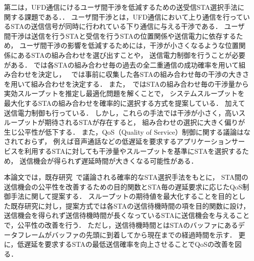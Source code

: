 \documentclass[master]{kuisthesis}		%
\begin{document}
\par
第二は，UFD通信にけるユーザ間干渉を低減するための送受信STA選択手法に関する課題である．．
ユーザ間干渉とは，UFD通信において上り通信を行っているSTAの送信信号が同時に行われている下り通信に与える干渉である．
ユーザ間干渉は送信を行うSTAと受信を行うSTAの位置関係や送信電力に依存するため，
ユーザ間干渉の影響を低減するためには，干渉が小さくなるような位置関係にあるSTAの組み合わせを選び出すことや，
送信電力制御を行うことが必要がある．
\cite{contra}では各STAの組み合わせ毎の過去の全二重通信の成功確率を用いて組み合わせを決定し，
~\cite{janus,goyal}では事前に収集した各STAの組み合わせ毎の干渉の大きさを用いて組み合わせを決定する．
また，~\cite{promac}ではSTAの組み合わせ毎の干渉量から実効スループットを推定し最適化問題を解くことで，
システムスループットを最大化するSTAの組み合わせを確率的に選択する方式を提案している．
加えて送信電力制御も行っている．
しかし，これらの手法では干渉が小さく，高いスループットが期待されるSTAが存在すると，
組み合わせの選択に大きく偏りが生じ公平性が低下する．
また，QoS（Quality of Service）制御に関する議論はなされておらず，
例えば音声通話などの低遅延を要求するアプリケーションサービスを利用するSTAに対しても干渉量やスループットを基準にSTAを選択するため，
送信機会が得られず遅延時間が大きくなる可能性がある．
\par
本論文では，既存研究~\cite{promac}で議論される確率的なSTA選択手法をもとに，
STA間の送信機会の公平性を改善するための目的関数とSTA毎の遅延要求に応じたQoS制御手法に関して提案する．
スループットの期待値を最大化することを目的とした既存研究に対し，提案方式では各STAの送信待機時間の項を目的関数に設け，
送信機会を得られず送信待機時間が長くなっているSTAに送信機会を与えることで，公平性の改善を行う．
ただし，送信待機時間とはSTAのバッファにあるデータフレームがバッファの先頭に到着してから現在までの経過時間を示す．
更に，低遅延を要求するSTAの最低送信確率を向上させることでQoSの改善を図る．
\end{document}
